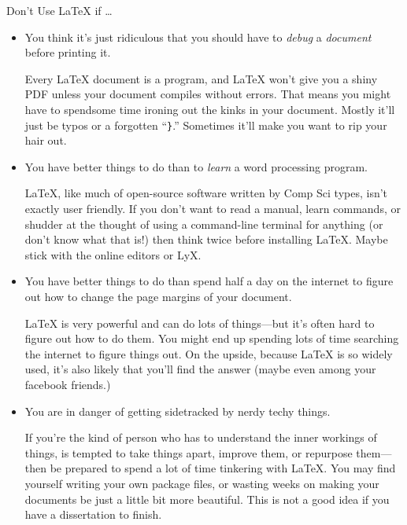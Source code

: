 \begin{frame}[fragile]{Don't Use \LaTeX{} if \dots}

\begin{itemize}
\item You think it's just ridiculous that you should have to \emph{debug} a
  \emph{document} before printing it.

\begin{articleonly}
Every \LaTeX{} document is a program, and \LaTeX{} won't give you a
shiny PDF unless your document compiles without errors.  That means
you might have to spendsome time ironing out the kinks in your
document.  Mostly it'll just be typos or a forgotten ``\texttt{\}}.''
Sometimes it'll make you want to rip your hair out.
\end{articleonly}

\item You have better things to do than to \emph{learn} a word
  processing program.

\begin{articleonly}
\LaTeX{}, like much of open-source software written by Comp Sci types,
isn't exactly user friendly. If you don't want to read a manual, learn
commands, or shudder at the thought of using a command-line terminal
for anything (or don't know what that is!) then think twice before
installing \LaTeX. Maybe stick with the online editors or LyX.
\end{articleonly}

\item You have better things to do than spend half a
  day on the internet to figure out how to change the page margins of
  your document.

\begin{articleonly}
\LaTeX{} is very powerful and can do lots of things---but it's often
hard to figure out how to do them.  You might end up spending lots of
time searching the internet to figure things out. On the upside,
because \LaTeX{} is so widely used, it's also likely that you'll find
the answer (maybe even among your facebook friends.)
\end{articleonly}

\item You are in danger of getting sidetracked by nerdy techy things.

\begin{articleonly}
If you're the kind of person who has to understand the inner workings
of things, is tempted to take things apart, improve them, or repurpose
them---then be prepared to spend a lot of time tinkering with
\LaTeX. You may find yourself writing your own package files, or
wasting weeks on making your documents be just a little bit more
beautiful. This is not a good idea if you have a dissertation to
finish.
\end{articleonly}
\end{itemize}

\end{frame}

